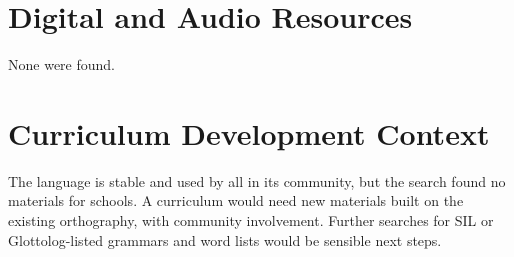 \documentclass[12pt]{article}
\begin{document}
\section{Digital and Audio Resources}
None were found.

\section{Curriculum Development Context}
The language is stable and used by all in its community, but the search found no materials for schools. A curriculum would need new materials built on the existing orthography, with community involvement. Further searches for SIL or Glottolog-listed grammars and word lists would be sensible next steps.
\end{document}

